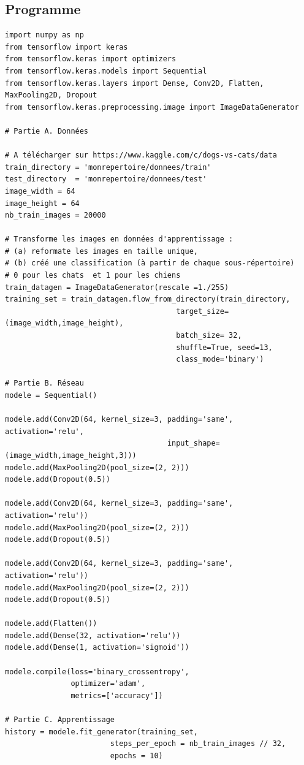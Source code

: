 \documentclass[11pt,class=report,crop=false]{standalone}
\begin{document}
\subsection{Programme}

\begin{lstlisting}
import numpy as np
from tensorflow import keras
from tensorflow.keras import optimizers
from tensorflow.keras.models import Sequential
from tensorflow.keras.layers import Dense, Conv2D, Flatten, MaxPooling2D, Dropout
from tensorflow.keras.preprocessing.image import ImageDataGenerator

# Partie A. Données

# A télécharger sur https://www.kaggle.com/c/dogs-vs-cats/data
train_directory = 'monrepertoire/donnees/train'
test_directory  = 'monrepertoire/donnees/test'
image_width = 64
image_height = 64
nb_train_images = 20000

# Transforme les images en données d'apprentissage : 
# (a) reformate les images en taille unique, 
# (b) créé une classification (à partir de chaque sous-répertoire) 
# 0 pour les chats  et 1 pour les chiens 
train_datagen = ImageDataGenerator(rescale =1./255)
training_set = train_datagen.flow_from_directory(train_directory,
                                       target_size=(image_width,image_height),
                                       batch_size= 32,
                                       shuffle=True, seed=13,
                                       class_mode='binary')

# Partie B. Réseau 
modele = Sequential()

modele.add(Conv2D(64, kernel_size=3, padding='same', activation='relu', 
                                     input_shape=(image_width,image_height,3)))
modele.add(MaxPooling2D(pool_size=(2, 2)))
modele.add(Dropout(0.5))

modele.add(Conv2D(64, kernel_size=3, padding='same', activation='relu'))
modele.add(MaxPooling2D(pool_size=(2, 2)))
modele.add(Dropout(0.5))

modele.add(Conv2D(64, kernel_size=3, padding='same', activation='relu'))
modele.add(MaxPooling2D(pool_size=(2, 2)))
modele.add(Dropout(0.5))

modele.add(Flatten())
modele.add(Dense(32, activation='relu'))
modele.add(Dense(1, activation='sigmoid'))

modele.compile(loss='binary_crossentropy',
               optimizer='adam',
               metrics=['accuracy'])

# Partie C. Apprentissage
history = modele.fit_generator(training_set,
                        steps_per_epoch = nb_train_images // 32,
                        epochs = 10)

\end{lstlisting}
\end{document}
